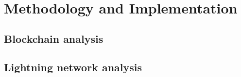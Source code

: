 \chapter{Methodology and Implementation}
\label{chap:metodology}

\section{Blockchain analysis}

\section{Lightning network analysis}